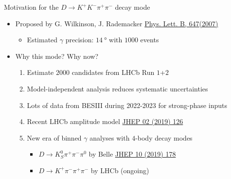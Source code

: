 \documentclass{beamer}
\begin{document}
\begin{frame}{Motivation for the $D\to K^+K^-\pi^+\pi^-$ decay mode}
  \begin{itemize}
    \setlength\itemsep{1.3em}
    \item{Proposed by G. Wilkinson, J. Rademacker \href{https://arxiv.org/abs/hep-ph/0611272}{Phys. Lett. B, 647(2007)}}
    \begin{itemize}
      \item{Estimated $\gamma$ precision: $\SI{14}{\degree}$ with $1000$ events}
    \end{itemize}
    \item{Why this mode? Why now?}
    \begin{enumerate}
      \setlength\itemsep{1.0em}
      \item{Estimate $2000$ candidates from LHCb Run $1$+$2$}
      \item{Model-independent analysis reduces systematic uncertainties}
      \item{Lots of data from BESIII during 2022-2023 for strong-phase inputs}
      \item{Recent LHCb amplitude model \href{https://arxiv.org/abs/1811.08304}{JHEP 02 (2019) 126}}
      \item{New era of binned $\gamma$ analyses with $4$-body decay modes}
      \begin{itemize}
        \item{$D\to K_S^0\pi^+\pi^-\pi^0$ by Belle \href{https://arxiv.org/abs/1908.09499}{JHEP 10 (2019) 178}}
        \item{$D\to K^+\pi^-\pi^+\pi^-$ by LHCb (ongoing)}
      \end{itemize}
    \end{enumerate}
  \end{itemize}
\end{frame}
\end{document}
